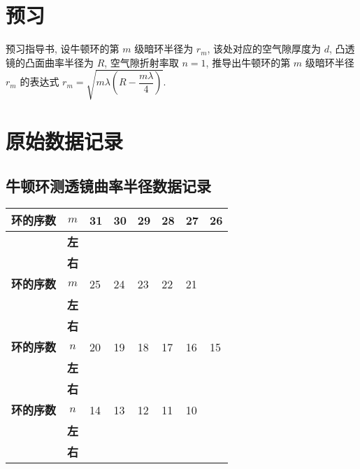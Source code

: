 \documentclass[signature=data]{physicsreport}
\begin{document}
\maketitle

\section{预习}
预习指导书, 设牛顿环的第 $m$ 级暗环半径为 $r_m$, 该处对应的空气隙厚度为 $d$, 凸透镜的凸面曲率半径为 $R$, 空气隙折射率取 $n=1$, 推导出牛顿环的第 $m$ 级暗环半径 $r_m$ 的表达式 $r_m=\sqrt{m\lambda\left(R-\dfrac{m\lambda}{4}\right)}$.

\makeatletter
{}
\makeatother

\newpage
\section{原始数据记录}
\subsection{牛顿环测透镜曲率半径数据记录}
\begin{table*}[ht]
     \centering
     \begin{tabularx}{\textwidth}{|>{\bfseries}c|>{\bfseries}c|Y|Y|Y|Y|Y|Y|} \hline
          环的序数 & $m$ & 31 & 30 & 29 & 28 & 27 & 26 \\\hline
           & 左 & & & & & & \\
               & 右   &    &    &    &    &    &    \\\hline
          环的序数 & $m$ & 25 & 24 & 23 & 22 & 21 &    \\\hline
           & 左 & & & & & & \\
               & 右   &    &    &    &    &    &    \\\hline
          环的序数 & $n$ & 20 & 19 & 18 & 17 & 16 & 15 \\\hline
           & 左 & & & & & & \\
               & 右   &    &    &    &    &    &    \\\hline
          环的序数 & $n$ & 14 & 13 & 12 & 11 & 10 &    \\\hline
           & 左 & & & & & & \\
               & 右   &    &    &    &    &    &    \\\hline
     \end{tabularx}
\end{table*}
\end{document}
